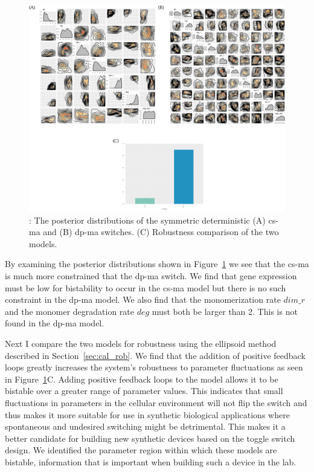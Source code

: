 \begin{figure}[htbp]
\begin{center}
\includegraphics[width=\textwidth]{../../chapters/chapterStabilityFinder/images/MA_sym_post.png}
\caption[LoF caption]{ \label{fig:ma-sym-det-post}: The posterior distributions of the symmetric deterministic (A) \acrshort{cs-ma} and (B) \acrshort{dp-ma} switches. (C) Robustness comparison of the two models. }
\end{center}
\end{figure}
\clearpage

By examining the posterior distributions shown in Figure~\ref{fig:ma-sym-det-post} we see that the \acrshort{cs-ma} is much more constrained that the \acrshort{dp-ma} switch. We find that gene expression must be low for bistability to occur in the \acrshort{cs-ma} model but there is no such constraint in the \acrshort{dp-ma} model. We also find that the monomerization rate $dim\_r$ and the monomer degradation rate $deg$ must both be larger than 2. This is not found in the \acrshort{dp-ma} model. 

Next I compare the two models for robustness using the ellipsoid method described in Section~\ref{sec:cal_rob}. We find that the addition of positive feedback loops greatly increases the system's robustness to parameter fluctuations as seen in Figure~\ref{fig:ma-sym-det-post}C. Adding positive feedback loops to the model allows it to be bistable over a greater range of parameter values. This indicates that small fluctuations in parameters in the cellular environment will not flip the switch and thus makes it more suitable for use in synthetic biological applications where spontaneous and undesired switching might be detrimental. This makes it a better candidate for building new synthetic devices based on the toggle switch design. We identified the parameter region within which these models are bistable, information that is important when building such a device in the lab.


